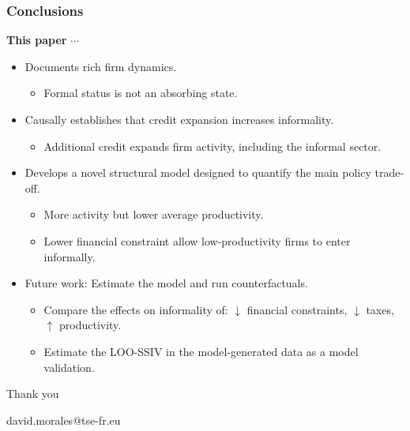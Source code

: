 \documentclass[aspectratio=169]{beamer}
\begin{document}

\begin{frame}
\frametitle{\textbf{Conclusions}} \label{conclusion}

\textbf{This paper} $\cdots$

\vspace{5mm}

\begin{itemize}
    \item Documents rich firm dynamics.
    \begin{itemize}
        \item Formal status is not an absorbing state.
    \end{itemize}
    \vspace{3mm}
    \item Causally establishes that credit expansion increases informality.
    \begin{itemize}
        \item Additional credit expands firm activity, including the informal sector.
    \end{itemize}
    \vspace{3mm}
    \item Develops a novel structural model designed to quantify the main policy trade-off.
    \begin{itemize}
        \item More activity but lower average productivity.
        \item Lower financial constraint allow low-productivity firms to enter informally.
    \end{itemize}
    \vspace{3mm}
    \item Future work: Estimate the model and run counterfactuals.
    \begin{itemize}
        \item Compare the effects on informality of: $\downarrow$ financial constraints, $\downarrow$ taxes, $\uparrow$ productivity.
        \item Estimate the LOO-SSIV in the model-generated data as a model validation.
    \end{itemize}
\end{itemize}

\end{frame}

\begin{frame}[noframenumbering]
\centering
\Huge Thank you

\vspace{10mm}

\Large david.morales@tse-fr.eu

\end{frame}
\end{document}
